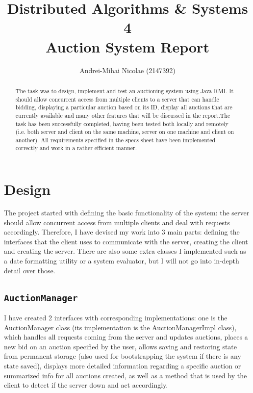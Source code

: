 \documentclass[11pt]{article}
\begin{document}
\posttitle{\end{center}}

\title{Distributed Algorithms \& Systems 4 \\ Auction System Report}
\author{Andrei-Mihai Nicolae (2147392)}

\maketitle

\begin{abstract}
 The task was to design, implement and test an auctioning system using Java RMI. It should allow concurrent access from multiple clients to a server that can handle bidding, displaying a particular auction based on its ID, display all auctions that are currently available and many other features that will be discussed in the report.The task has been successfully completed, having been tested both locally and remotely (i.e. both server and client on the same machine, server on one machine and client on another). All requirements specified in the specs sheet have been implemented correctly and work in a rather efficient manner.
\end{abstract}

\section{Design}
 The project started with defining the basic functionality of the system: the server should allow concurrent access from multiple clients and deal with requests accordingly. Therefore, I have devised my work into 3 main parts: defining the interfaces that the client uses to communicate with the server, creating the client and creating the server. There are also some extra classes I implemented such as a date formatting utility or a system evaluator, but I will not go into in-depth detail over those.
 
 \subsection{\texttt{AuctionManager}}
 I have created 2 interfaces with corresponding implementations: one is the AuctionManager class (its implementation is the AuctionManagerImpl class), which handles all requests coming from the server and updates auctions, places a new bid on an auction specified by the user, allows saving and restoring state from permanent storage (also used for bootstrapping the system if there is any state saved), displays more detailed information regarding a specific auction or summarized info for all auctions created, as well as a method that is used by the client to detect if the server down and act accordingly.
 
\end{document}
